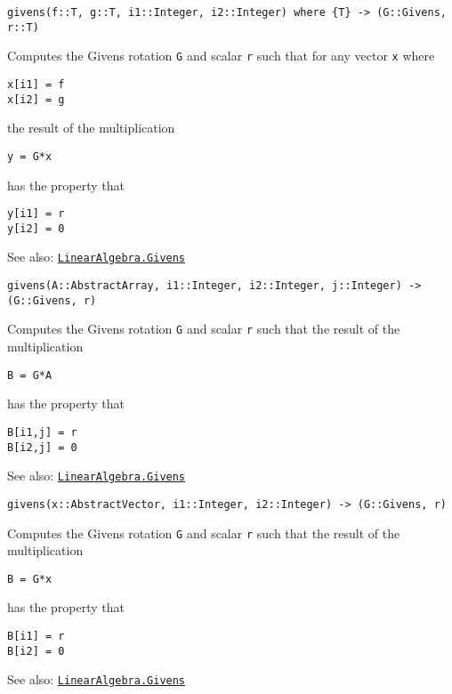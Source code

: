\begin{adjustwidth}{2em}{0pt}


\begin{verbatim}
givens(f::T, g::T, i1::Integer, i2::Integer) where {T} -> (G::Givens, r::T)
\end{verbatim}

Computes the Givens rotation \texttt{G} and scalar \texttt{r} such that for any vector \texttt{x} where


\begin{lstlisting}
x[i1] = f
x[i2] = g
\end{lstlisting}

the result of the multiplication


\begin{lstlisting}
y = G*x
\end{lstlisting}

has the property that


\begin{lstlisting}
y[i1] = r
y[i2] = 0
\end{lstlisting}

See also: \hyperlink{7608839947605749416}{\texttt{LinearAlgebra.Givens}}




\begin{lstlisting}
givens(A::AbstractArray, i1::Integer, i2::Integer, j::Integer) -> (G::Givens, r)
\end{lstlisting}

Computes the Givens rotation \texttt{G} and scalar \texttt{r} such that the result of the multiplication


\begin{lstlisting}
B = G*A
\end{lstlisting}

has the property that


\begin{lstlisting}
B[i1,j] = r
B[i2,j] = 0
\end{lstlisting}

See also: \hyperlink{7608839947605749416}{\texttt{LinearAlgebra.Givens}}




\begin{lstlisting}
givens(x::AbstractVector, i1::Integer, i2::Integer) -> (G::Givens, r)
\end{lstlisting}

Computes the Givens rotation \texttt{G} and scalar \texttt{r} such that the result of the multiplication


\begin{lstlisting}
B = G*x
\end{lstlisting}

has the property that


\begin{lstlisting}
B[i1] = r
B[i2] = 0
\end{lstlisting}

See also: \hyperlink{7608839947605749416}{\texttt{LinearAlgebra.Givens}}



\end{adjustwidth}
